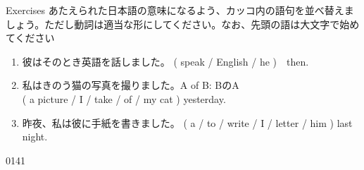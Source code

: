 \documentclass[aspectratio=169,xcolor={dvipsnames,table}]{beamer}
\newcommand{\myaudio}[1]{\href{#1}{\faVolumeUp}}
\begin{document}
\begin{frame}[plain]{Exercises}
あたえられた日本語の意味になるよう、カッコ内の語句を並べ替えましょう。ただし動詞は適当な形にしてください。なお、先頭の語は大文字で始めてください


\begin{enumerate}
 \item 彼はそのとき英語を話しました。%
\hfill{}( speak / English  / he )~~then.\\
 \item 私はきのう猫の写真を撮りました。\hfill{\scriptsize A of B: BのA}\\
\mbox{}\hfill{}( a picture / I / take / of / my cat ) yesterday.\\
 \item 昨夜、私は彼に手紙を書きました。
( a / to / write / I / letter / him ) last night.\\
\end{enumerate}
\hfill{\tiny 0141}\,{\scriptsize \myaudio{./audio/025_past_do_17.mp3}}

\end{frame}
\end{document}
